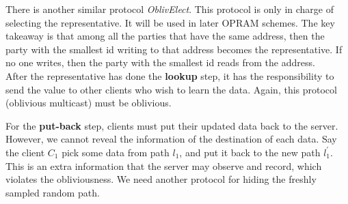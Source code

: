\documentclass[fontsize=11pt]{article}
\begin{document}
There is another similar protocol \textit{OblivElect}. This protocol is only in charge of selecting the representative. It will be used in later OPRAM schemes. The key takeaway is that among all the parties that have the same address, then the party with the smallest id writing to that address becomes the representative. If no one writes, then the party with the smallest id reads from the address.\\

After the representative has done the \textbf{lookup} step, it has the responsibility to send the value to other clients who wish to learn the data. Again, this protocol (oblivious multicast) must be oblivious. 

\begin{center}
\end{center}

For the \textbf{put-back} step, clients must put their updated data back to the server. However, we cannot reveal the information of the destination of each data. Say the client $C_1$ pick some data from path $l_1$, and put it back to the new path $l_1^\prime$. This is an extra information that the server may observe and record, which violates the obliviousness. We need another protocol for hiding the freshly sampled random path. 


\begin{center}
\end{center}
\end{document}
